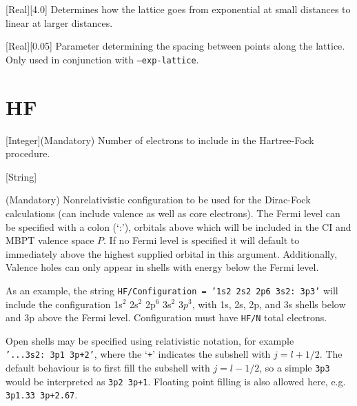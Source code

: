\documentclass{report}
\begin{document}
[Real][4.0]{%
Determines how the lattice goes from exponential at small distances to linear at larger distances.%
}


[Real][0.05]{%
Parameter determining the spacing between points along the lattice. Only used in conjunction with
\texttt{--exp-lattice}.%
}

\section{HF}

[Integer]{(Mandatory) Number of electrons to include in the Hartree-Fock procedure.}

[String]{%
(Mandatory) Nonrelativistic configuration to be used for the
Dirac-Fock calculations (can include valence as well as core electrons). The Fermi level can be specified
with a colon (`:'), orbitals above which will be included in the CI and MBPT valence space $P$. If no
Fermi level is specified it will default to immediately above the highest supplied orbital in this
argument. Additionally, Valence holes can only appear in shells with energy below the Fermi level.

As an example, the string \texttt{HF/Configuration = '1s2 2s2 2p6 3s2:~3p3'} will include the configuration
1s$^2$ 2s$^2$ 2p$^6$ 3s$^2$ $3p^3$, with 1s, 2s, 2p, and 3s shells below and 3p above the Fermi level.
Configuration must have \texttt{HF/N} total electrons.

Open shells may be specified using relativistic notation, for example \texttt{'...3s2:~3p1 3p+2'}, where the `\texttt{+}' indicates the subshell with $j = l+1/2$. The default behaviour is to first fill the subshell with $j = l-1/2$, so a simple \texttt{3p3} would be interpreted as \texttt{3p2 3p+1}. Floating point filling is also allowed here, e.g. \texttt{3p1.33 3p+2.67}.%
}


\end{document}
